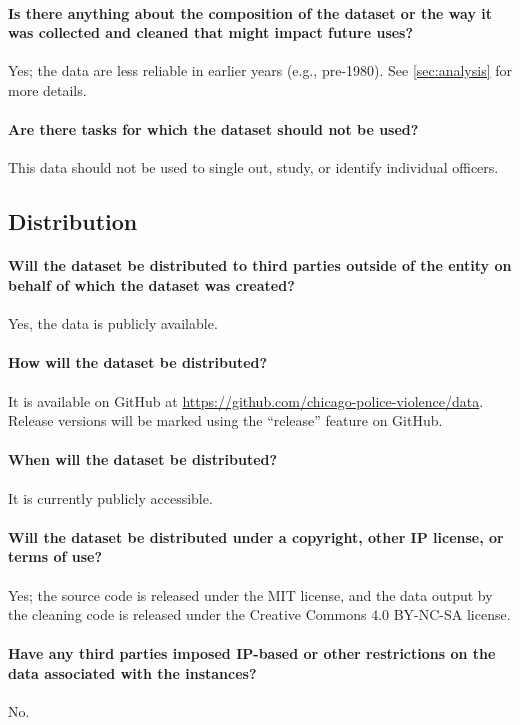 \paragraph{Is there anything about the composition of the dataset or the way it was collected and cleaned that might impact future uses?}
Yes; the data are less reliable in earlier years (e.g., pre-1980). See \cref{sec:analysis} for more details.

\paragraph{Are there tasks for which the dataset should not be used?}
This data should not be used to single out, study, or identify individual officers.

\subsection{Distribution}

\paragraph{Will the dataset be distributed to third parties outside of the entity on behalf of which the dataset was created?}
Yes, the data is publicly available.

\paragraph{How will the dataset be distributed?}
It is available on GitHub at \url{https://github.com/chicago-police-violence/data}.
Release versions will be marked using the ``release'' feature on GitHub.

\paragraph{When will the dataset be distributed?}
It is currently publicly accessible.

\paragraph{Will the dataset be distributed under a copyright, other IP license, or terms of use?}
Yes; the source code is released under the MIT license, and the data output by the cleaning code is released under the Creative Commons 4.0 BY-NC-SA license.

\paragraph{Have any third parties imposed IP-based or other restrictions on the data associated with the instances?}
No.

